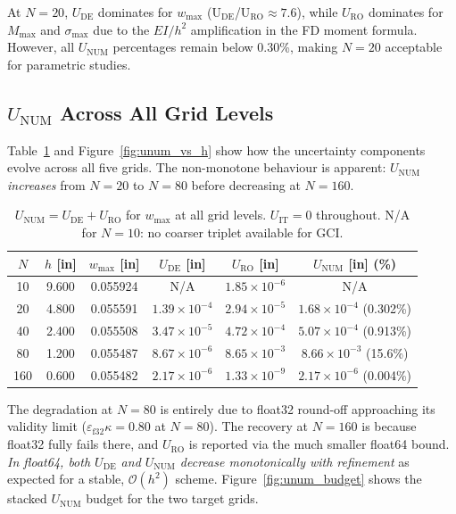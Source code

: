 \documentclass[11pt,letterpaper]{article}
\newcommand{\UDE}{U_{\mathrm{DE}}}
\newcommand{\UIT}{U_{\mathrm{IT}}}
\newcommand{\URO}{U_{\mathrm{RO}}}
\newcommand{\UNUM}{U_{\mathrm{NUM}}}
\newcommand{\EI}{EI}
\begin{document}
At $N=20$, $\UDE$ dominates for $w_{\max}$ (U$_{\mathrm{DE}}$/U$_{\mathrm{RO}}
\approx7.6$), while $\URO$ dominates for $M_{\max}$ and $\sigma_{\max}$
due to the $\EI/h^2$ amplification in the FD moment formula.
However, all $\UNUM$ percentages remain below 0.30\%, making $N=20$
acceptable for parametric studies.

\subsection{\texorpdfstring{$\UNUM$}{U\_NUM} Across All Grid Levels}

Table~\ref{tab:unum_all} and Figure~\ref{fig:unum_vs_h} show how the
uncertainty components evolve across all five grids.
The non-monotone behaviour is apparent: $\UNUM$ \emph{increases} from
$N=20$ to $N=80$ before decreasing at $N=160$.

\begin{table}[h!]
\centering
\caption{$\UNUM = \UDE + \URO$ for $w_{\max}$ at all grid levels.
$\UIT=0$ throughout. N/A for $N=10$: no coarser triplet available for GCI.}
\label{tab:unum_all}
\begin{tabular}{cccccc}
  \toprule
  $N$ & $h$ [in] & $w_{\max}$ [in] & $\UDE$ [in] & $\URO$ [in] & $\UNUM$ [in] (\%) \\
  \midrule
  10  & 9.600 & 0.055924 & N/A                 & $1.85\times10^{-6}$ & N/A \\
  20  & 4.800 & 0.055591 & $1.39\times10^{-4}$ & $2.94\times10^{-5}$ & $1.68\times10^{-4}$ (0.302\%) \\
  40  & 2.400 & 0.055508 & $3.47\times10^{-5}$ & $4.72\times10^{-4}$ & $5.07\times10^{-4}$ (0.913\%) \\
  80  & 1.200 & 0.055487 & $8.67\times10^{-6}$ & $8.65\times10^{-3}$ & $8.66\times10^{-3}$ (15.6\%) \\
  160 & 0.600 & 0.055482 & $2.17\times10^{-6}$ & $1.33\times10^{-9}$ & $2.17\times10^{-6}$ (0.004\%) \\
  \bottomrule
\end{tabular}
\end{table}

The degradation at $N=80$ is entirely due to float32 round-off approaching
its validity limit ($\varepsilon_{\mathrm{f32}}\kappa=0.80$ at $N=80$).
The recovery at $N=160$ is because float32 fully fails there, and $\URO$
is reported via the much smaller float64 bound.  \emph{In float64, both
$\UDE$ and $\UNUM$ decrease monotonically with refinement} as expected
for a stable, $\mathcal{O}(h^2)$ scheme. Figure~\ref{fig:unum_budget}
shows the stacked $\UNUM$ budget for the two target grids.
\end{document}

